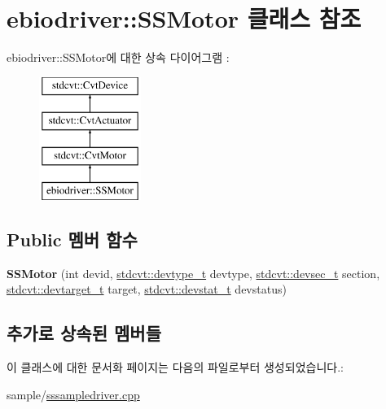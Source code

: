 \hypertarget{classebiodriver_1_1SSMotor}{}\section{ebiodriver\+:\+:S\+S\+Motor 클래스 참조}
\label{classebiodriver_1_1SSMotor}
ebiodriver\+:\+:S\+S\+Motor에 대한 상속 다이어그램 \+: \begin{figure}[H]
\begin{center}
\leavevmode
\includegraphics[height=4.000000cm]{classebiodriver_1_1SSMotor}
\end{center}
\end{figure}
\subsection*{Public 멤버 함수}
\begin{DoxyCompactItemize}
\item 
{\bfseries S\+S\+Motor} (int devid, \hyperlink{cvtcode_8h_ae8e34073e35cef0bb47c7fa535fc638b}{stdcvt\+::devtype\+\_\+t} devtype, \hyperlink{cvtcode_8h_a268eebb73363e24b9e65fd51973bd9c0}{stdcvt\+::devsec\+\_\+t} section, \hyperlink{cvtcode_8h_a2b37fd5cc4d40c0b8c4b987c271e5ceb}{stdcvt\+::devtarget\+\_\+t} target, \hyperlink{cvtcode_8h_ad21cd565f839adc5b19a0993e7da7278}{stdcvt\+::devstat\+\_\+t} devstatus)\hypertarget{classebiodriver_1_1SSMotor_a49e940a10a2c2abada3707429824fff0}{}\label{classebiodriver_1_1SSMotor_a49e940a10a2c2abada3707429824fff0}

\end{DoxyCompactItemize}
\subsection*{추가로 상속된 멤버들}


이 클래스에 대한 문서화 페이지는 다음의 파일로부터 생성되었습니다.\+:\begin{DoxyCompactItemize}
\item 
sample/\hyperlink{sssampledriver_8cpp}{sssampledriver.\+cpp}\end{DoxyCompactItemize}
